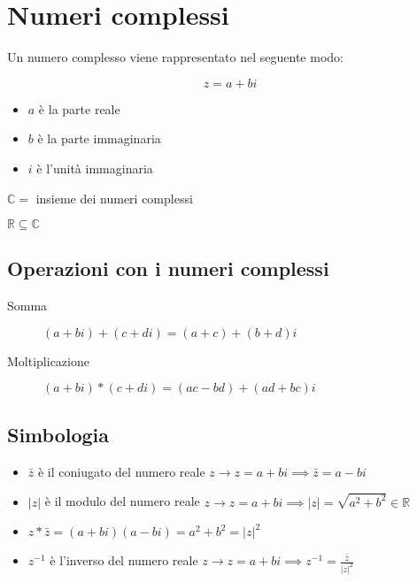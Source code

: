 \documentclass{article}
\begin{document}
\section{Numeri complessi}

Un numero complesso viene rappresentato nel seguente modo:

$$
z = a + bi
$$

\begin{itemize}
    \item $a$ è la parte reale
    \item $b$ è la parte immaginaria
    \item $i$ è l'unità immaginaria
\end{itemize}

\begin{description}
    \item $\mathbb{C} =$ insieme dei numeri complessi
    \item $\mathbb{R} \subseteq \mathbb{C}$
\end{description}

\subsection{Operazioni con i numeri complessi}

\begin{description}
    \item[Somma] $(a+bi) + (c+di) = (a+c) + (b+d)i$
    \item[Moltiplicazione] $(a+bi) * (c+di) = (ac - bd) + (ad + bc)i$
\end{description}

\subsection{Simbologia}

\begin{itemize}
    \item $\bar{z}$ è il coniugato del numero reale $z \longrightarrow z = a+bi \implies \bar{z} = a-bi$
    \item $|z|$ è il modulo del numero reale $z \longrightarrow z = a+bi \implies |z| = \sqrt{a^2 + b^2} \in \mathbb{R}$
    \item $z * \bar{z} = (a+bi)(a-bi) = a^2 + b^2 = |z|^2$
    \item $z^{-1}$ è l'inverso del numero reale $z \longrightarrow z = a+bi \implies z^{-1} = \frac{\bar{z}}{|z|^2}$
\end{itemize}
\end{document}
